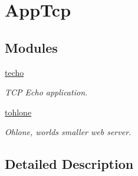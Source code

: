 \hypertarget{group___app_tcp}{}\section{App\+Tcp}
\label{group___app_tcp}
\subsection*{Modules}
\begin{DoxyCompactItemize}
\item 
\hyperlink{group__techo}{techo}
\begin{DoxyCompactList}\small\item\em T\+CP Echo application. \end{DoxyCompactList}\item 
\hyperlink{group__tohlone}{tohlone}
\begin{DoxyCompactList}\small\item\em Ohlone, world\textquotesingle{}s smaller web server. \end{DoxyCompactList}\end{DoxyCompactItemize}


\subsection{Detailed Description}
